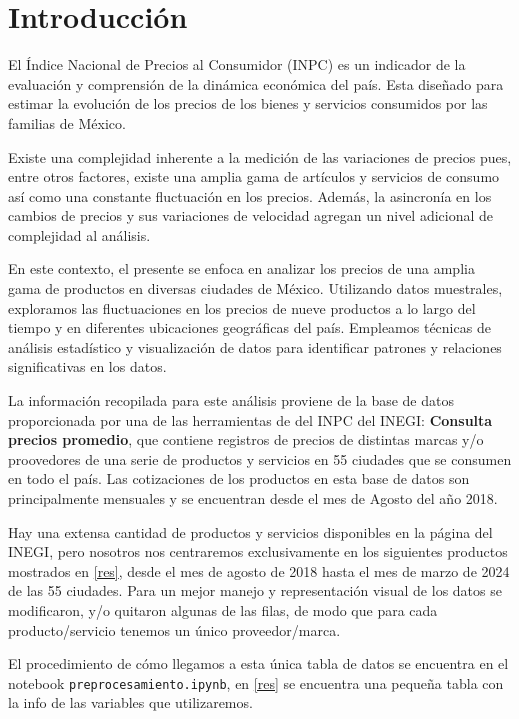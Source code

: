 \documentclass[letterpaper,spanish,reprint,nofootinbib,showkeys,aps]{revtex4-2}
\begin{document}
\section{Introducción}



El Índice Nacional de Precios al Consumidor (INPC) es un indicador de la evaluación y comprensión de la dinámica económica del país. Esta diseñado para estimar la evolución de los precios de los bienes y servicios consumidos por las familias de México.

Existe una complejidad inherente a la medición de las variaciones de precios pues, entre otros factores, existe una amplia gama de artículos y servicios de consumo así como una constante fluctuación en los precios. Además, la asincronía en los cambios de precios y sus variaciones de velocidad agregan un nivel adicional de complejidad al análisis.

En este contexto, el presente se enfoca en analizar los precios de una amplia gama de productos en diversas ciudades de México. Utilizando datos muestrales, exploramos las fluctuaciones en los precios de nueve productos a lo largo del tiempo y en diferentes ubicaciones geográficas del país. Empleamos técnicas de análisis estadístico y visualización de datos para identificar patrones y relaciones significativas en los datos.

La información recopilada para este análisis proviene de la base de datos proporcionada por una de las herramientas de del INPC del INEGI: \textbf{Consulta precios promedio}, que contiene registros de precios de distintas marcas y/o proovedores de una serie de productos y servicios en 55 ciudades que se consumen en todo el país. Las cotizaciones de los productos en esta base de datos son principalmente mensuales y se encuentran desde el mes de Agosto del año 2018.

Hay una extensa cantidad de productos y servicios disponibles en la página del INEGI, pero nosotros nos centraremos exclusivamente en los siguientes productos mostrados en \ref{res}, desde el mes de agosto de 2018 hasta el mes de marzo de 2024 de las 55 ciudades. Para un mejor manejo y representación visual de los datos se modificaron, y/o quitaron
algunas de las filas, de modo que para cada producto/servicio tenemos un único proveedor/marca. 

El procedimiento de cómo llegamos a esta única tabla de datos se encuentra en el notebook \texttt{preprocesamiento.ipynb}, en \ref{res} se encuentra una pequeña tabla con la info de las variables que utilizaremos.
\end{document}
